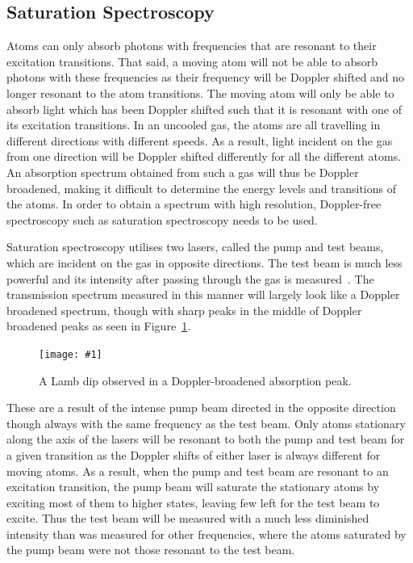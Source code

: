 \documentclass[twocolumn]{article}
\newcommand{\insertFigure}[1]{%
   \texttt{[image: \#1]}%
}
\begin{document}
\subsection{Saturation Spectroscopy}
Atoms can only absorb photons with frequencies that are resonant to their excitation transitions. That said, a moving atom will not be able to absorb photons with these frequencies as their frequency will be Doppler shifted and no longer resonant to the atom transitions. The moving atom will only be able to absorb light which has been Doppler shifted such that it is resonant with one of its excitation transitions. In an uncooled gas, the atoms are all travelling in different directions with different speeds. As a result, light incident on the gas from one direction will be Doppler shifted differently for all the different atoms. An absorption spectrum obtained from such a gas will thus be Doppler broadened, making it difficult to determine the energy levels and transitions of the atoms. In order to obtain a spectrum with high resolution, Doppler-free spectroscopy such as saturation spectroscopy needs to be used. \\
\par Saturation spectroscopy utilises two lasers, called the pump and test beams, which are incident on the gas in opposite directions. The test beam is much less powerful and its intensity after passing through the gas is measured~\cite{manual}. %
The transmission spectrum measured in this manner will largely look like a Doppler broadened spectrum, though with sharp peaks in the middle of Doppler broadened peaks as seen in Figure~\ref{fig:Lamb}.
\begin{figure} [!h]
	\centering
	\insertFigure{Images/Lamb.png}
	\caption{A Lamb dip observed in a Doppler-broadened absorption peak.~\cite{manual}}
	\label{fig:Lamb}
\end{figure}
These are a result of the intense pump beam directed in the opposite direction though always with the same frequency as the test beam. Only atoms stationary along the axis of the lasers will be resonant to both the pump and test beam for a given transition as the Doppler shifts of either laser is always different for moving atoms. As a result, when the pump and test beam are resonant to an excitation transition, the pump beam will saturate the stationary atoms by exciting most of them to higher states, leaving few left for the test beam to excite. Thus the test beam will be measured with a much less diminished intensity than was measured for other frequencies, where the atoms saturated by the pump beam were not those resonant to the test beam. %
\end{document}
